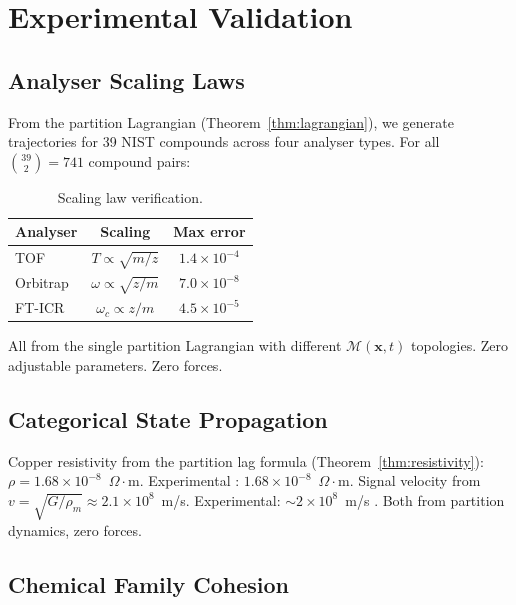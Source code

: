 \documentclass[11pt,twocolumn,a4paper]{article}
\theoremstyle{definition}
\theoremstyle{remark}
\newcommand{\Depth}{\mathcal{M}}
\begin{document}
\section{Experimental Validation}
\label{sec:validation}

\subsection{Analyser Scaling Laws}

From the partition Lagrangian (Theorem~\ref{thm:lagrangian}), we generate trajectories for 39 NIST compounds \citep{johnson2022} across four analyser types. For all $\binom{39}{2} = 741$ compound pairs:

\begin{table}[H]
\centering
\caption{Scaling law verification.}
\small
\begin{tabular}{lcc}
\toprule
\textbf{Analyser} & \textbf{Scaling} & \textbf{Max error} \\
\midrule
TOF & $T \propto \sqrt{m/z}$ & $1.4 \times 10^{-4}$ \\
Orbitrap & $\omega \propto \sqrt{z/m}$ & $7.0 \times 10^{-8}$ \\
FT-ICR & $\omega_c \propto z/m$ & $4.5 \times 10^{-5}$ \\
\bottomrule
\end{tabular}
\end{table}

All from the single partition Lagrangian with different $\Depth(\mathbf{x},t)$ topologies. Zero adjustable parameters. Zero forces.

\subsection{Categorical State Propagation}

Copper resistivity from the partition lag formula (Theorem~\ref{thm:resistivity}): $\rho = 1.68 \times 10^{-8}$~$\Omega\cdot$m. Experimental \citep{haynes2016}: $1.68 \times 10^{-8}$~$\Omega\cdot$m. Signal velocity from $v = \sqrt{G/\rho_m} \approx 2.1\times 10^8$~m/s. Experimental: $\sim 2\times 10^8$~m/s \citep{griffiths2017}. Both from partition dynamics, zero forces.

\subsection{Chemical Family Cohesion}
\end{document}
